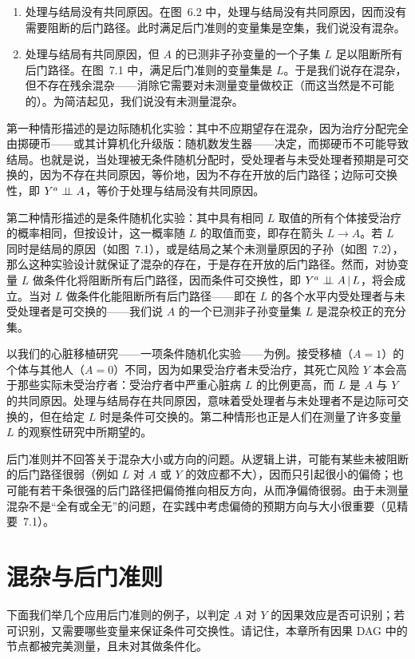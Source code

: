 \begin{enumerate}
\item 处理与结局没有共同原因。在图~6.2 中，处理与结局没有共同原因，因而没有需要阻断的后门路径。此时满足后门准则的变量集是空集，我们说没有混杂。
\item 处理与结局有共同原因，但 $A$ 的已测非子孙变量的一个子集 $L$ 足以阻断所有后门路径。在图~7.1 中，满足后门准则的变量集是 $L$。于是我们说存在混杂，但不存在残余混杂——消除它需要对未测量变量做校正（而这当然是不可能的）。为简洁起见，我们说没有未测量混杂。
\end{enumerate}

第一种情形描述的是边际随机化实验：其中不应期望存在混杂，因为治疗分配完全由掷硬币——或其计算机化升级版：随机数发生器——决定，而掷硬币不可能导致结局。也就是说，当处理被无条件随机分配时，受处理者与未受处理者预期是可交换的，因为不存在共同原因，等价地，因为不存在开放的后门路径；边际可交换性，即 $Y^{a}\perp\!\!\!\perp A$，等价于处理与结局没有共同原因。

第二种情形描述的是条件随机化实验：其中具有相同 $L$ 取值的所有个体接受治疗的概率相同，但按设计，这一概率随 $L$ 的取值而变，即存在箭头 $L\to A$。若 $L$ 同时是结局的原因（如图~7.1），或是结局之某个未测量原因的子孙（如图~7.2），那么这种实验设计就保证了混杂的存在，于是存在开放的后门路径。然而，对协变量 $L$ 做条件化将阻断所有后门路径，因而条件可交换性，即 $Y^{a}\perp\!\!\!\perp A\,|\, L$，将会成立。当对 $L$ 做条件化能阻断所有后门路径——即在 $L$ 的各个水平内受处理者与未受处理者是可交换的——我们说 $A$ 的一个已测非子孙变量集 $L$ 是混杂校正的充分集。

以我们的心脏移植研究——一项条件随机化实验——为例。接受移植（$A=1$）的个体与其他人（$A=0$）不同，因为如果受治疗者未受治疗，其死亡风险 $Y$ 本会高于那些实际未受治疗者：受治疗者中严重心脏病 $L$ 的比例更高，而 $L$ 是 $A$ 与 $Y$ 的共同原因。处理与结局存在共同原因，意味着受处理者与未处理者不是边际可交换的，但在给定 $L$ 时是条件可交换的。第二种情形也正是人们在测量了许多变量 $L$ 的观察性研究中所期望的。

后门准则并不回答关于混杂大小或方向的问题。从逻辑上讲，可能有某些未被阻断的后门路径很弱（例如 $L$ 对 $A$ 或 $Y$ 的效应都不大），因而只引起很小的偏倚；也可能有若干条很强的后门路径把偏倚推向相反方向，从而净偏倚很弱。由于未测量混杂不是“全有或全无”的问题，在实践中考虑偏倚的预期方向与大小很重要（见精要~7.1）。

\section{混杂与后门准则}

下面我们举几个应用后门准则的例子，以判定 $A$ 对 $Y$ 的因果效应是否可识别；若可识别，又需要哪些变量来保证条件可交换性。请记住，本章所有因果 DAG 中的节点都被完美测量，且未对其做条件化。

